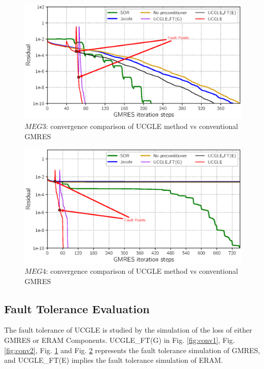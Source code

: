 \begin{figure}[htbp]
	\centering
	\includegraphics[width=0.99\linewidth]{fig/convergence3.eps}
	\caption{$MEG3$: convergence comparison of UCGLE method vs conventional GMRES}
	\label{fig:conv3}
\end{figure}

\begin{figure}[htbp]
	\centering
	\includegraphics[width=0.99\linewidth]{fig/convergence4.eps}
	\caption{$MEG4$: convergence comparison of UCGLE method vs conventional GMRES}
	\label{fig:conv4}
\end{figure}

\subsection{Fault Tolerance Evaluation}

The fault tolerance of UCGLE is studied by the simulation of the loss of either GMRES or ERAM Components. UCGLE\_FT(G) in Fig. \ref{fig:conv1}, Fig. \ref{fig:conv2}, Fig. \ref{fig:conv3} and Fig. \ref{fig:conv4} represents the fault tolerance simulation of GMRES, and UCGLE\_FT(E) implies the fault tolerance simulation of ERAM. 

